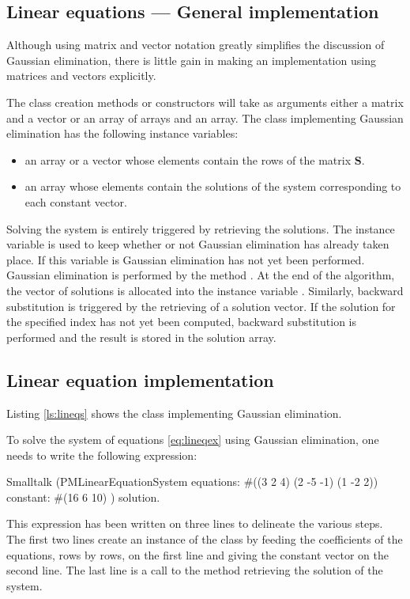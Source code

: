 \subsection{Linear equations --- General implementation}
 Although using matrix and vector
notation greatly simplifies the discussion of Gaussian
elimination, there is little gain in making an implementation
using matrices and vectors explicitly.

The class creation methods or constructors will take as arguments
either a matrix and a vector or an array of arrays and an array.
The class implementing Gaussian elimination has the following
instance variables:
\begin{itemize}
  \item {} an array or a vector whose elements contain the rows of the
  matrix $\textbf{S}$.
  \item {} an array whose elements contain the solutions of the
  system corresponding to each constant vector.
\end{itemize}

Solving the system is entirely triggered by retrieving the
solutions.
The instance variable  is used to keep
whether or not Gaussian elimination has already taken place. If
this variable is  Gaussian elimination has not yet been
performed. Gaussian elimination is performed by the method .
At the end of the algorithm, the vector of solutions is
allocated into the instance variable . Similarly,
backward substitution is triggered by the retrieving of a solution
vector. If the solution for the specified index has not yet been
computed, backward substitution is performed and the result is
stored in the solution array.

\subsection{Linear equation implementation}
Listing \ref{ls:lineqs} shows the class  implementing Gaussian elimination.

To solve the system of equations \ref{eq:lineqex} using Gaussian elimination, one needs to write the following expression:
\begin{displaycode}{Smalltalk}
(PMLinearEquationSystem equations: #((3 2 4)
                                   (2 -5 -1)
                                   (1 -2 2))
                      constant: #(16 6 10)
     ) solution.
\end{displaycode}
This expression has been written on three lines to delineate the
various steps. The first two lines create an instance of the class
 by feeding the coefficients of the
equations, rows by rows, on the first line and giving the constant
vector on the second line. The last line is a call to the method
 retrieving the solution of the system.

